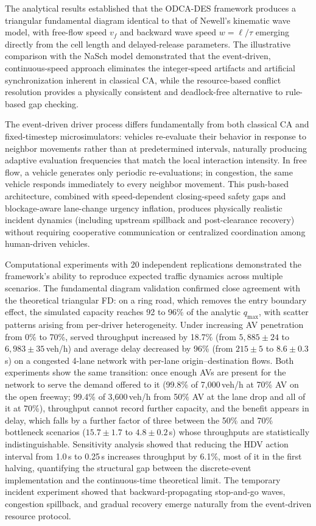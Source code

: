 \documentclass[review,authoryear]{elsarticle}
\begin{document}
The analytical results established that the ODCA-DES framework produces a triangular fundamental diagram identical to that of Newell's kinematic wave model, with free-flow speed $v_f$ and backward wave speed $w = \ell/\tau$ emerging directly from the cell length and delayed-release parameters. The illustrative comparison with the NaSch model demonstrated that the event-driven, continuous-speed approach eliminates the integer-speed artifacts and artificial synchronization inherent in classical CA, while the resource-based conflict resolution provides a physically consistent and deadlock-free alternative to rule-based gap checking.

The event-driven driver process differs fundamentally from both classical CA and fixed-timestep microsimulators: vehicles re-evaluate their behavior in response to neighbor movements rather than at predetermined intervals, naturally producing adaptive evaluation frequencies that match the local interaction intensity. In free flow, a vehicle generates only periodic re-evaluations; in congestion, the same vehicle responds immediately to every neighbor movement. This push-based architecture, combined with speed-dependent closing-speed safety gaps and blockage-aware lane-change urgency inflation, produces physically realistic incident dynamics (including upstream spillback and post-clearance recovery) without requiring cooperative communication or centralized coordination among human-driven vehicles.

Computational experiments with 20 independent replications demonstrated the framework's ability to reproduce expected traffic dynamics across multiple scenarios. The fundamental diagram validation confirmed close agreement with the theoretical triangular FD: on a ring road, which removes the entry boundary effect, the simulated capacity reaches 92 to 96\% of the analytic $q_{\max}$, with scatter patterns arising from per-driver heterogeneity. Under increasing AV penetration from 0\% to 70\%, served throughput increased by 18.7\% (from $5{,}885 \pm 24$ to $6{,}983 \pm 35$\,veh/h) and average delay decreased by 96\% (from $215 \pm 5$ to $8.6 \pm 0.3$\,s) on a congested 4-lane network with per-lane origin--destination flows. Both experiments show the same transition: once enough AVs are present for the network to serve the demand offered to it (99.8\% of 7{,}000\,veh/h at 70\% AV on the open freeway; 99.4\% of 3{,}600\,veh/h from 50\% AV at the lane drop and all of it at 70\%), throughput cannot record further capacity, and the benefit appears in delay, which falls by a further factor of three between the 50\% and 70\% bottleneck scenarios ($15.7 \pm 1.7$ to $4.8 \pm 0.2$\,s) whose throughputs are statistically indistinguishable. Sensitivity analysis showed that reducing the HDV action interval from 1.0\,s to 0.25\,s increases throughput by 6.1\%, most of it in the first halving, quantifying the structural gap between the discrete-event implementation and the continuous-time theoretical limit. The temporary incident experiment showed that backward-propagating stop-and-go waves, congestion spillback, and gradual recovery emerge naturally from the event-driven resource protocol.
\end{document}

